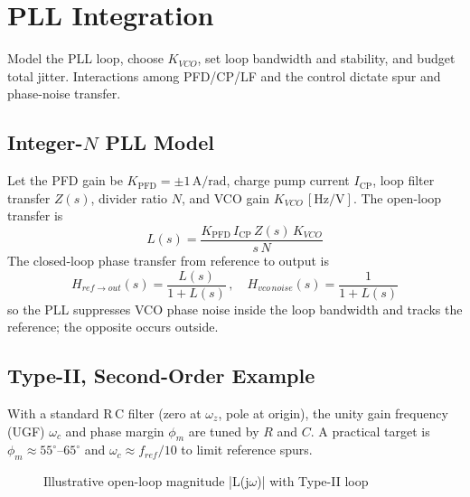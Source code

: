 \chapter{PLL Integration}
Model the PLL loop, choose \(K_{VCO}\), set loop bandwidth and stability, and budget total jitter. Interactions among PFD/CP/LF and the \VCO{} control dictate spur and phase-noise transfer.

\section{Integer-$N$ PLL Model}
Let the PFD gain be \(K_{\mathrm{PFD}}=\pm 1\,\mathrm{A/rad}\), charge pump current \(I_{\mathrm{CP}}\), loop filter transfer \(Z(s)\), divider ratio \(N\), and VCO gain \(K_{VCO}\,[\mathrm{Hz/V}]\). The open-loop transfer is
\[
 L(s) = \frac{K_{\mathrm{PFD}}\,I_{\mathrm{CP}}\,Z(s)\,K_{VCO}}{s\,N}
\]
The closed-loop phase transfer from reference to output is
\[
 H_{ref\to out}(s) = \frac{L(s)}{1+L(s)}\,,\quad H_{vco\,noise}(s) = \frac{1}{1+L(s)}
\]
so the PLL suppresses VCO phase noise inside the loop bandwidth and tracks the reference; the opposite occurs outside.

\section{Type-II, Second-Order Example}
With a standard R\,C filter (zero at \(\omega_z\), pole at origin), the unity gain frequency (UGF) \(\omega_c\) and phase margin \(\phi_m\) are tuned by \(R\) and \(C\). A practical target is \(\phi_m\approx 55^\circ\)–\(65^\circ\) and \(\omega_c \approx f_{ref}/10\) to limit reference spurs.

\begin{figure}[H]
  \centering
  \caption{Illustrative open-loop magnitude |L(j$\omega$)| with Type-II loop}
\end{figure}

